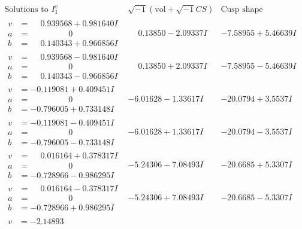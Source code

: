 \documentclass[1p]{elsarticle_modified}
\theoremstyle{definition}
\newcommand{\I}{\sqrt{-1}}
\begin{document}
$$\begin{array}{c|c|c}  
\text{Solutions to }I^v_{1}& \I (\text{vol} + \sqrt{-1}CS) & \text{Cusp shape}\\
 \hline 
\begin{aligned}
v &= \phantom{-}0.939568 + 0.981640 I \\
a &= \phantom{-0.000000 } 0 \\
b &= \phantom{-}0.140343 + 0.966856 I\end{aligned}
 & \phantom{-}0.13850 - 2.09337 I & -7.58955 + 5.46639 I \\ \hline\begin{aligned}
v &= \phantom{-}0.939568 - 0.981640 I \\
a &= \phantom{-0.000000 } 0 \\
b &= \phantom{-}0.140343 - 0.966856 I\end{aligned}
 & \phantom{-}0.13850 + 2.09337 I & -7.58955 - 5.46639 I \\ \hline\begin{aligned}
v &= -0.119081 + 0.409451 I \\
a &= \phantom{-0.000000 } 0 \\
b &= -0.796005 + 0.733148 I\end{aligned}
 & -6.01628 - 1.33617 I & -20.0794 + 3.5537 I \\ \hline\begin{aligned}
v &= -0.119081 - 0.409451 I \\
a &= \phantom{-0.000000 } 0 \\
b &= -0.796005 - 0.733148 I\end{aligned}
 & -6.01628 + 1.33617 I & -20.0794 - 3.5537 I \\ \hline\begin{aligned}
v &= \phantom{-}0.016164 + 0.378317 I \\
a &= \phantom{-0.000000 } 0 \\
b &= -0.728966 - 0.986295 I\end{aligned}
 & -5.24306 - 7.08493 I & -20.6685 + 5.3307 I \\ \hline\begin{aligned}
v &= \phantom{-}0.016164 - 0.378317 I \\
a &= \phantom{-0.000000 } 0 \\
b &= -0.728966 + 0.986295 I\end{aligned}
 & -5.24306 + 7.08493 I & -20.6685 - 5.3307 I \\ \hline\begin{aligned}
v &= -2.14893\phantom{ +0.000000I} \\

\end{aligned}
\end{array}$$
\end{document}
